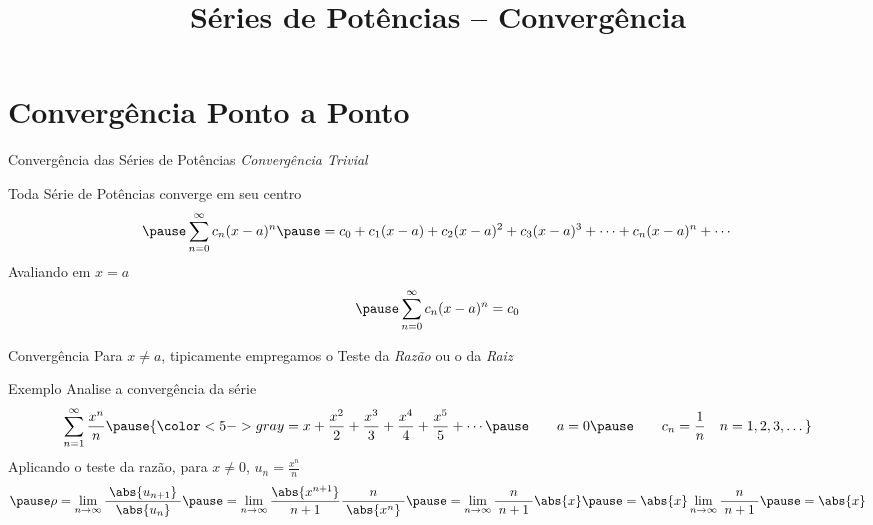 
\usepackage{integracao_e_series}

\title{Séries de Potências -- Convergência}



\addtitle

\section{Convergência Ponto a Ponto}

\begin{frame}{Convergência das Séries de Potências}
  \emph{Convergência Trivial}

  \pause
  \vspace{\baselineskip}
  Toda Série de Potências converge em seu centro
  \[
    \pause
    \sum_{n=0}^\infty c_n(x-a)^n
    \pause
    = c_0
    + c_1(x-a)
    + c_2(x-a)^2
    + c_3(x-a)^3
    + \cdots
    + c_n(x-a)^n
    + \cdots
  \]
  \pause
  Avaliando em $x=a$
  \[
    \pause
    \sum_{n=0}^\infty c_n(x-a)^n
    = c_0
  \]
\end{frame}

\begin{frame}{Convergência}
  Para \emph{$x\neq a$},
  tipicamente empregamos o Teste da \emph{Razão} ou o da \emph{Raiz}
\end{frame}

\addtocounter{exemplo}{1}
\begin{frame}{Exemplo \theexemplo}
  Analise a convergência da série
  \[
    \sum_{n=1}^{\infty} \frac{x^n}{n}
    \pause
    {\color<5->{gray}
    = x + \frac{x^2}{2}
        + \frac{x^3}{3}
        + \frac{x^4}{4}
        + \frac{x^5}{5}
        + \cdots
    \pause
    \qquad
    a = 0
    \pause
    \qquad
    c_n = \frac{1}{n} \quad n = 1, 2, 3, \dots}
  \]
  \pause
  Aplicando o teste da razão, para $x\neq 0$,
  \pause
  \quad\(u_n = \frac{x^n}{n}\)
  \[
    \pause \rho = \lim_{n\to\infty} \frac{\;\abs{u_{n+1}}\;}{\abs{u_n}}
    \pause = \lim_{n\to\infty} \frac{\abs{x^{n+1}}}{\;n+1\;} \frac{n}{\;\abs{x^n}\;}
    \pause = \lim_{n\to\infty} \frac{n}{\;n+1\;} \abs{x}
    \pause = \abs{x} \lim_{n\to\infty} \frac{n}{\;n+1\;}
    \pause = \abs{x}
  \]
\end{frame}

